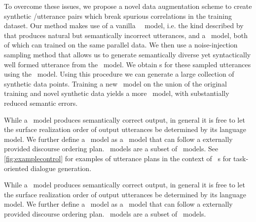 
To overcome these issues, we propose a novel data augmentation scheme to
create synthetic \meaningrepresentation/utterance pairs which break spurious
correlations in the training dataset. Our method makes use of a vanilla
\sequencetosequence~\naturallanguagegeneration~model, i.e. the kind described
by \citet{dusek2020} that produces natural but semantically incorrect
utterances, and a \naturallanguageunderstanding~model, both of which can
trained on the same parallel data.  We then use a noise-injection sampling
method \citep{noise} that allows us to generate semantically diverse yet
syntactically well formed utterance from the \naturallanguagegeneration~model.
We obtain \meaningrepresentation s for these sampled utterances using the
\naturallanguageunderstanding~model.  Using this procedure we can generate a
large collection of synthetic data points. Training a new
\sequencetosequence~model on the union of the original training and novel
synthetic data yields a more \faithfulgeneration~model, with substantially
reduced semantic errors.


While a
\faithfulgeneration~model produces semantically correct output, in general
it is free to let the surface realization order of output utterances
be determined by its language model. We further define a 
\controllablegeneration~model as a \naturallanguagegeneration~model that can
follow a externally provided discourse ordering plan. 
\Controllablegeneration~models are a subset of \faithfulgeneration~models.
See \autoref{fig:examplecontrol} for examples of utterance plans in the
context of \meaningrepresentation~s for task-oriented dialogue generation.
















 While a
\faithfulgeneration~model produces semantically correct output, in general
it is free to let the surface realization order of output utterances
be determined by its language model. We further define a 
\controllablegeneration~model as a \naturallanguagegeneration~model that can
follow a externally provided discourse ordering plan. 
\Controllablegeneration~models are a subset of \faithfulgeneration~models.

